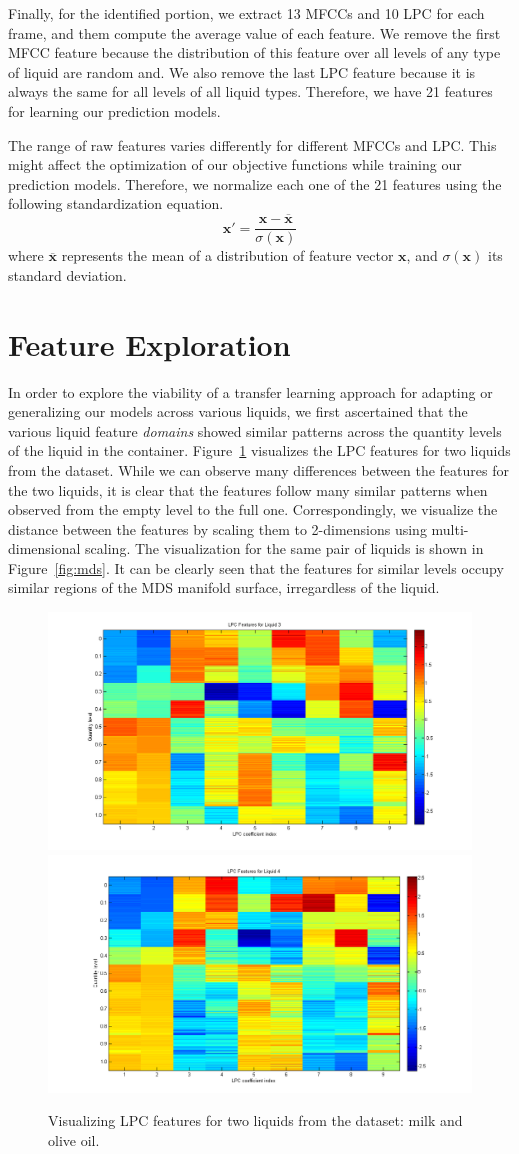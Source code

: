 \documentclass{article} %
\begin{document}
Finally, for the identified portion, we extract 13 MFCCs and 10 LPC for each frame, and them compute the average value of each feature. We remove the first MFCC feature because the distribution of this feature over all levels of any type of liquid are random and. We also remove the last LPC feature because it is always the same for all levels of all liquid types. Therefore, we have 21 features for learning our prediction models.

The range of raw features varies differently for different MFCCs and LPC. This might affect the optimization of our objective functions while training our prediction models. Therefore, we normalize each one of the 21 features using the following standardization equation.
\[\mathbf{x'} = \frac{\mathbf{x}-\overline{\mathbf{x}}}{\sigma(\mathbf{x})}\]
where $\overline{\mathbf{x}}$ represents the mean of a distribution of feature vector $\mathbf{x}$, and $\sigma(\mathbf{x})$ its standard deviation.

\section{Feature Exploration}
In order to explore the viability of a transfer learning approach for adapting or generalizing our models across various liquids, we first ascertained that the various liquid feature {\em domains} showed similar patterns across the quantity levels of the liquid in the container. Figure~\ref{fig:features} visualizes the LPC features for two liquids from the dataset. While we can observe many differences between the features for the two liquids, it is clear that the features follow many similar patterns when observed from the empty level to the full one. Correspondingly, we visualize the distance between the features by scaling them to 2-dimensions using multi-dimensional scaling. The visualization for the same pair of liquids is shown in Figure~\ref{fig:mds}. It can be clearly seen that the features for similar levels occupy similar regions of the MDS manifold surface, irregardless of the liquid.

\begin{figure}[tbh]
\centering
\includegraphics[width=0.49\linewidth]{lpc_3.png}
\includegraphics[width=0.49\linewidth]{lpc_4.png}
\caption{Visualizing LPC features for two liquids from the dataset: milk and olive oil.}
\label{fig:features}
\end{figure}
\end{document}

